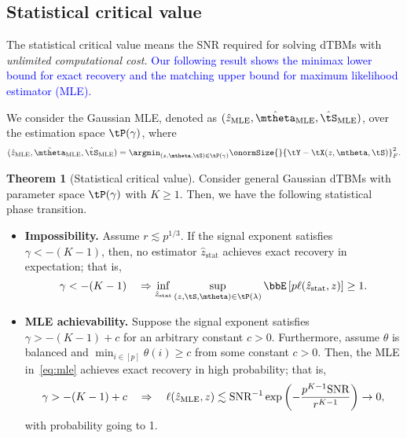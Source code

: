 \documentclass[lettersize,onecolumn,journal]{IEEEtran}
\theoremstyle{definition}
\newtheorem{thm}{Theorem}
\theoremstyle{definition}
\begin{document}
\subsection{Statistical critical value}\label{sec:statlimit}
The statistical critical value means the SNR required for solving dTBMs with \emph{unlimited computational cost.} \textcolor{blue}{Our following result shows the minimax lower bound for exact recovery and the matching upper bound for maximum likelihood estimator (MLE). }
{
\color{blue} We consider the Gaussian MLE, denoted as $(\hat z_{\text{MLE}}, \hat \mtheta_{\text{MLE}}, \hat \tS_{\text{MLE}})$, over the estimation space $\tP(\gamma)$, where 
\begin{equation}\label{eq:mle}
    (\hat z_{\text{MLE}}, \hat \mtheta_{\text{MLE}}, \hat \tS_{\text{MLE}}) = \argmin_{ (z, \mtheta, \tS) \in \tP (\gamma)} \onormSize{}{\tY - \tX(z,\mtheta, \tS)}_F^2.
\end{equation}

\begin{thm}[Statistical critical value]\label{thm:stats} Consider general Gaussian dTBMs with parameter space $\tP(\gamma)$ with $K\geq 1$. Then, we have the following statistical phase transition. 

\begin{itemize}[wide]
    \item \textbf{Impossibility.} 
Assume $r\lesssim p^{1/3}$. If the signal exponent satisfies $\gamma < -(K-1)$, then, no estimator $\hat z_{\text{stat}}$ achieves exact recovery in expectation; that is,
\begin{equation}
  \gamma< -(K-1) \quad \Rightarrow  \inf_{\hat z_{\text{stat}}}\sup_{(z, \tS, \mtheta)\in\tP(\lambda)} \bbE \left[ p\ell(\hat z_{\text{stat}}, z) \right]\geq 1.
\end{equation}
\item \textbf{MLE achievability.} Suppose the signal exponent satisfies $\gamma >-(K-1)+c$ for an arbitrary constant $c>0$. Furthermore, assume $\theta$ is balanced and $\min_{i\in[p]}\theta(i)\geq c$ from some constant $c>0$. Then, the MLE in~\eqref{eq:mle} achieves exact recovery in high probability; that is,
\begin{equation}
\gamma> -(K-1)+c \quad  \Rightarrow  \quad \ell(\hat z_{\text{MLE}}, z) \lesssim \text{SNR}^{-1}\exp\left(-{p^{K-1}\text{SNR}\over r^{K-1}}\right) \to 0,
\end{equation}
with probability going to 1. 
\end{itemize}
\end{thm}

}
\end{document}
